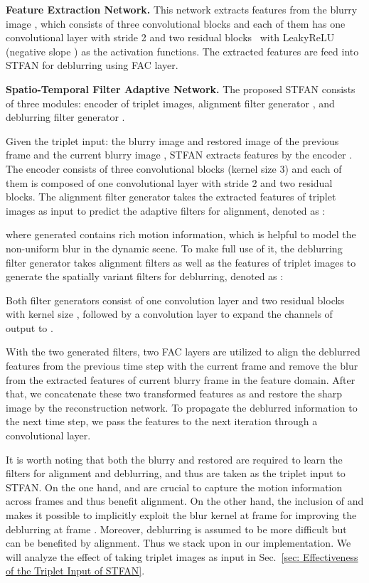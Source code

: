 \documentclass[10pt,twocolumn,letterpaper]{article}
\begin{document}
\noindent \textbf{Feature Extraction Network.}
This network extracts features  from the blurry image ,
which consists of three convolutional blocks and each of them has one convolutional layer with stride 2 and two residual blocks~\cite{he2016deep} with LeakyReLU (negative slope ) as the activation functions.
The extracted features are feed into STFAN for deblurring using FAC layer.


\noindent \textbf{Spatio-Temporal Filter Adaptive Network.}
The proposed STFAN consists of three modules: encoder  of triplet images, alignment filter generator , and deblurring filter generator .


Given the triplet input: the blurry image  and restored image  of the previous frame and the current blurry image , STFAN extracts features  by the encoder .
The encoder consists of three convolutional blocks (kernel size 3) and each of them is composed of one convolutional layer with stride 2 and two residual blocks.
The alignment filter generator  takes the extracted features  of triplet images as input to predict the adaptive filters for alignment, denoted as :

where generated  contains rich motion information, which is helpful to model the non-uniform blur in the dynamic scene.
To make full use of it, the deblurring filter generator  takes alignment filters  as well as the features  of triplet images to generate the spatially variant filters for deblurring, denoted as :

Both filter generators consist of one convolution layer and two residual blocks with kernel size , followed by a  convolution layer to expand the channels of output to .


With the two generated filters, two FAC layers are utilized to align the deblurred features  from the previous time step with the current frame and remove the blur from the extracted features  of current blurry frame in the feature domain.
After that, we concatenate these two transformed features as  and restore the sharp image by the reconstruction network.
To propagate the deblurred information  to the next time step, we pass the features  to the next iteration through a convolutional layer.


It is worth noting that both the blurry  and restored  are required to learn the filters for alignment and deblurring, and thus are taken as the triplet input to STFAN.
On the one hand,  and  are crucial to capture the motion information across frames and thus benefit alignment. 
On the other hand, the inclusion of  and  makes it possible to implicitly exploit the blur kernel at frame  for improving the deblurring at frame .
Moreover, deblurring is assumed to be more difficult but can be benefited by alignment. Thus we stack  upon  in our implementation.
We will analyze the effect of taking triplet images  as input in Sec.~\ref{sec: Effectiveness of the Triplet Input of STFAN}.
\end{document}
